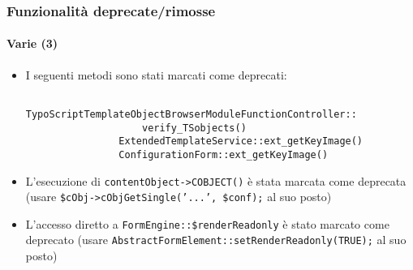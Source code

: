 \begin{frame}[fragile]
	\frametitle{Funzionalità deprecate/rimosse}
	\framesubtitle{Varie (3)}

	\begin{itemize}
		\item I seguenti metodi sono stati marcati come deprecati:

			\begin{lstlisting}
				TypoScriptTemplateObjectBrowserModuleFunctionController::
				    verify_TSobjects()
				ExtendedTemplateService::ext_getKeyImage()
				ConfigurationForm::ext_getKeyImage()
			\end{lstlisting}

 		\item L'esecuzione di \texttt{contentObject->COBJECT()} è stata marcata come deprecata\newline
 			\small(usare \texttt{\$cObj->cObjGetSingle('...', \$conf);} al suo posto)\normalsize
 
		\item L'accesso diretto a \texttt{FormEngine::\$renderReadonly} è stato marcato come deprecato\newline
			\small(usare \texttt{AbstractFormElement::setRenderReadonly(TRUE);} al suo posto)\normalsize
 
	\end{itemize}

\end{frame}


